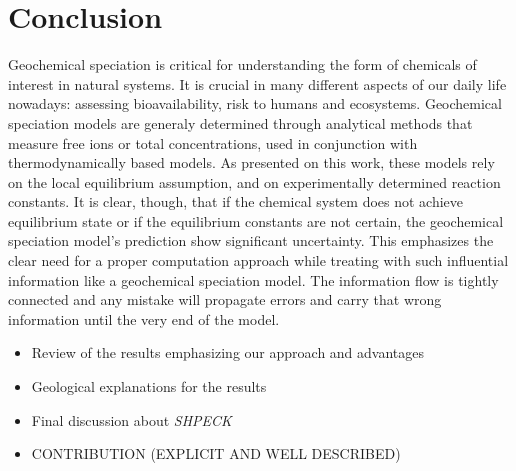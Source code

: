 \documentclass[ppgc,mestrado,english]{iiufrgs}
\begin{document}
\chapter{Conclusion}

Geochemical speciation is critical for understanding the form of chemicals of interest in natural systems. It is crucial in many different aspects of our daily life nowadays: assessing bioavailability, risk to humans and ecosystems. Geochemical speciation models are generaly determined through analytical methods that measure free ions or total concentrations, used in conjunction with thermodynamically based models. As presented on this work, these models rely on the local equilibrium assumption, and on experimentally determined reaction constants. It is clear, though, that if the chemical system does not achieve equilibrium state or if the equilibrium constants are not certain, the geochemical speciation model's prediction show significant uncertainty.
This emphasizes the clear need for a proper computation approach while treating with such influential information like a geochemical speciation model. The information flow is tightly connected and any mistake will propagate errors and carry that wrong information until the very end of the model.

\begin{itemize}
\item Review of the results emphasizing our approach and advantages
\item  Geological explanations for the results
\item  Final discussion about \emph{SHPECK}
\item  CONTRIBUTION (EXPLICIT AND WELL DESCRIBED) 
\end{itemize}


\end{document}
